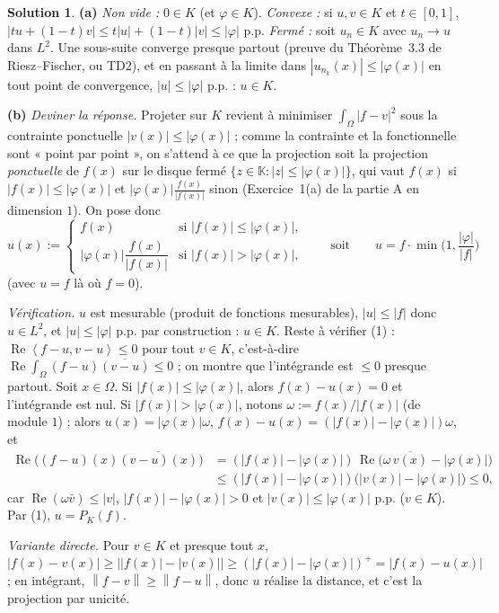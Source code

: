 \documentclass[11pt,a4paper]{article}
\newcommand{\K}{\mathbb{K}}
\newcommand{\norm}[1]{\left\|#1\right\|}
\newcommand{\ps}[2]{\left\langle #1,#2\right\rangle}
\renewcommand{\Re}{\operatorname{Re}}
\theoremstyle{definition}
\newtheorem*{solution}{Solution}
\begin{document}
\begin{solution}
\noindent\textbf{(a)} \emph{Non vide :} $0\in K$ (et $\varphi\in K$). \emph{Convexe :} si $u,v\in K$ et $t\in[0,1]$, $|tu+(1-t)v|\le t|u|+(1-t)|v|\le|\varphi|$ p.p. \emph{Fermé :} soit $u_n\in K$ avec $u_n\to u$ dans $L^2$. Une sous-suite converge presque partout (preuve du Théorème~3.3 de Riesz--Fischer, ou TD2), et en passant à la limite dans $|u_{n_k}(x)|\le|\varphi(x)|$ en tout point de convergence, $|u|\le|\varphi|$ p.p. : $u\in K$.

\medskip
\noindent\textbf{(b)} \emph{Deviner la réponse.} Projeter sur $K$ revient à minimiser $\int_\Omega|f-v|^2$ sous la contrainte ponctuelle $|v(x)|\le|\varphi(x)|$ ; comme la contrainte et la fonctionnelle sont « point par point », on s'attend à ce que la projection soit la projection \emph{ponctuelle} de $f(x)$ sur le disque fermé $\{z\in\K:|z|\le|\varphi(x)|\}$, qui vaut $f(x)$ si $|f(x)|\le|\varphi(x)|$ et $|\varphi(x)|\frac{f(x)}{|f(x)|}$ sinon (Exercice~1(a) de la partie A en dimension $1$). On pose donc
\[
u(x):=\begin{cases}f(x)&\text{si }|f(x)|\le|\varphi(x)|,\\[1mm] |\varphi(x)|\dfrac{f(x)}{|f(x)|}&\text{si }|f(x)|>|\varphi(x)|,\end{cases}
\qquad\text{soit}\qquad u=f\cdot\min\Big(1,\frac{|\varphi|}{|f|}\Big)
\]
(avec $u=f$ là où $f=0$).

\emph{Vérification.} $u$ est mesurable (produit de fonctions mesurables), $|u|\le|f|$ donc $u\in L^2$, et $|u|\le|\varphi|$ p.p. par construction : $u\in K$. Reste à vérifier (1) : $\Re\ps{f-u}{v-u}\le0$ pour tout $v\in K$, c'est-à-dire $\Re\int_\Omega(f-u)\overline{(v-u)}\le0$ ; on montre que l'intégrande est $\le0$ presque partout. Soit $x\in\Omega$. Si $|f(x)|\le|\varphi(x)|$, alors $f(x)-u(x)=0$ et l'intégrande est nul. Si $|f(x)|>|\varphi(x)|$, notons $\omega:=f(x)/|f(x)|$ (de module $1$) ; alors $u(x)=|\varphi(x)|\omega$, $f(x)-u(x)=(|f(x)|-|\varphi(x)|)\omega$, et
\[
\begin{aligned}
\Re\big((f-u)(x)\overline{(v-u)(x)}\big)&=(|f(x)|-|\varphi(x)|)\,\Re\big(\omega\,\overline{v(x)}-|\varphi(x)|\big)\\
&\le(|f(x)|-|\varphi(x)|)\big(|v(x)|-|\varphi(x)|\big)\le0,
\end{aligned}
\]
car $\Re(\omega\bar v)\le|v|$, $|f(x)|-|\varphi(x)|>0$ et $|v(x)|\le|\varphi(x)|$ p.p. ($v\in K$). Par (1), $u=P_K(f)$.

\emph{Variante directe.} Pour $v\in K$ et presque tout $x$, $|f(x)-v(x)|\ge\big||f(x)|-|v(x)|\big|\ge(|f(x)|-|\varphi(x)|)^+=|f(x)-u(x)|$ ; en intégrant, $\norm{f-v}\ge\norm{f-u}$, donc $u$ réalise la distance, et c'est la projection par unicité.
\end{solution}
\end{document}
